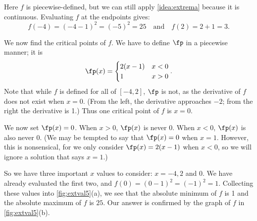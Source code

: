 {%
Here $f$ is piecewise-defined, but we can still apply \autoref{idea:extrema} because it is continuous. Evaluating $f$ at the endpoints gives: 
\[f(-4)=(-4-1)^2=(-5)^2 = 25 \quad \text{and} \quad f(2)=2+1 = 3.\]

We now find the critical points of $f$. We have to define $\fp$ in a piecewise manner; it is
\[\fp(x) =\begin{cases} 2(x-1) & x < 0 \\ 1 & x>0 \end{cases} .\]
Note that while $f$ is defined for all of $[-4,2]$, $\fp$ is not, as the derivative of $f$ does not exist when $x=0$. (From the left, the derivative approaches $-2$; from the right the derivative is 1.) Thus one critical point of $f$ is $x=0$.

We now set $\fp(x) = 0$. When $x >0$, $\fp(x)$ is never 0.  When $x<0$, $\fp(x)$ is also never 0. (We may be tempted to say that $\fp(x) = 0 $ when $x=1$. However, this is nonsensical, for we only consider $\fp(x) = 2(x-1)$ when $x<0$, so we will ignore a solution that says $x=1$.) 

So we have three important $x$ values to consider: $x= -4, 2$ and $0$. We have already evaluated the first two, and $f(0)=(0-1)^2=(-1)^2=1$.  Collecting these values into \autoref{fig:extval5}(a), we see that the absolute minimum of $f$ is 1 and the absolute maximum of $f$ is $25$. Our answer is confirmed by the graph of $f$ in \autoref{fig:extval5}(b).}

